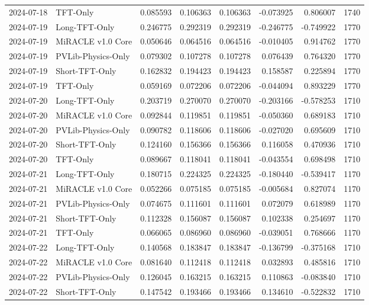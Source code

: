 \begin{tabular}{llrrrrrr}
2024-07-18 & TFT-Only & 0.085593 & 0.106363 & 0.106363 & -0.073925 & 0.806007 & 1740 \\
2024-07-19 & Long-TFT-Only & 0.246775 & 0.292319 & 0.292319 & -0.246775 & -0.749922 & 1770 \\
2024-07-19 & MiRACLE v1.0 Core & 0.050646 & 0.064516 & 0.064516 & -0.010405 & 0.914762 & 1770 \\
2024-07-19 & PVLib-Physics-Only & 0.079302 & 0.107278 & 0.107278 & 0.076439 & 0.764320 & 1770 \\
2024-07-19 & Short-TFT-Only & 0.162832 & 0.194423 & 0.194423 & 0.158587 & 0.225894 & 1770 \\
2024-07-19 & TFT-Only & 0.059169 & 0.072206 & 0.072206 & -0.044094 & 0.893229 & 1770 \\
2024-07-20 & Long-TFT-Only & 0.203719 & 0.270070 & 0.270070 & -0.203166 & -0.578253 & 1710 \\
2024-07-20 & MiRACLE v1.0 Core & 0.092844 & 0.119851 & 0.119851 & -0.050360 & 0.689183 & 1710 \\
2024-07-20 & PVLib-Physics-Only & 0.090782 & 0.118606 & 0.118606 & -0.027020 & 0.695609 & 1710 \\
2024-07-20 & Short-TFT-Only & 0.124160 & 0.156366 & 0.156366 & 0.116058 & 0.470936 & 1710 \\
2024-07-20 & TFT-Only & 0.089667 & 0.118041 & 0.118041 & -0.043554 & 0.698498 & 1710 \\
2024-07-21 & Long-TFT-Only & 0.180715 & 0.224325 & 0.224325 & -0.180440 & -0.539417 & 1170 \\
2024-07-21 & MiRACLE v1.0 Core & 0.052266 & 0.075185 & 0.075185 & -0.005684 & 0.827074 & 1170 \\
2024-07-21 & PVLib-Physics-Only & 0.074675 & 0.111601 & 0.111601 & 0.072079 & 0.618989 & 1170 \\
2024-07-21 & Short-TFT-Only & 0.112328 & 0.156087 & 0.156087 & 0.102338 & 0.254697 & 1170 \\
2024-07-21 & TFT-Only & 0.066065 & 0.086960 & 0.086960 & -0.039051 & 0.768666 & 1170 \\
2024-07-22 & Long-TFT-Only & 0.140568 & 0.183847 & 0.183847 & -0.136799 & -0.375168 & 1710 \\
2024-07-22 & MiRACLE v1.0 Core & 0.081640 & 0.112418 & 0.112418 & 0.032893 & 0.485816 & 1710 \\
2024-07-22 & PVLib-Physics-Only & 0.126045 & 0.163215 & 0.163215 & 0.110863 & -0.083840 & 1710 \\
2024-07-22 & Short-TFT-Only & 0.147542 & 0.193466 & 0.193466 & 0.134610 & -0.522832 & 1710 \\

\end{tabular}
